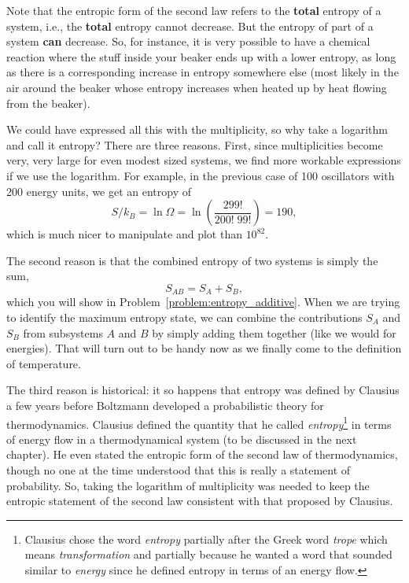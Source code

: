 Note that the entropic form of the second law refers to the \textbf{total}
entropy of a system, i.e., the \textbf{total} entropy cannot decrease.
But the entropy of part of a system \textbf{can} decrease.  So, for
instance, it is very possible to have a chemical reaction where
the stuff inside your beaker ends up with a lower entropy,
as long as there is a corresponding increase in entropy somewhere
else (most likely in the air around the beaker whose entropy
increases when heated up by heat flowing from the beaker).

We could have expressed all this with the multiplicity, so why
take a logarithm and call it entropy?  There are three reasons.  First,
since multiplicities become very, very large for even modest sized
systems, we find more workable expressions if we use the
logarithm.  For example, in the previous case of 100 oscillators with
200 energy units, we get an entropy of
\begin{equation}
 S/k_B = \ln\Omega = \ln\left(\frac{299!}{200!\;99!}\right) = 190 ,
\end{equation}
which is much nicer to manipulate and plot than $10^{82}$.

The second reason is that the combined entropy of two systems is
simply the sum,
\begin{equation}
S_{AB} = S_A + S_B,
\end{equation}
which you will show in Problem~\ref{problem:entropy_additive}.  When we
are trying to identify the maximum entropy state, we can combine the
contributions $S_A$ and $S_B$ from subsystems $A$ and $B$ by simply
adding them together (like we would for energies).  That will turn out
to be handy now as we finally come to the definition of temperature.

The third reason is historical: it so happens that entropy was defined
by Clausius a few years before Boltzmann developed a probabilistic
theory for thermodynamics. Clausius defined the quantity that he
called \emph{entropy}\footnote{Clausius chose the word \emph{entropy}
  partially after the Greek word \emph{trope} which means \emph{transformation} and partially because he wanted a word that
  sounded similar to \emph{energy} since he defined entropy in terms of
  an energy flow.}  in terms of energy flow in a thermodynamical
system (to be discussed in the next chapter).  He even stated the
entropic form of the second law of thermodynamics, though no one
at the time understood that this is really a statement of probability.
So, taking the logarithm of multiplicity was needed to keep the
entropic statement of the second law consistent with that proposed by
Clausius.


